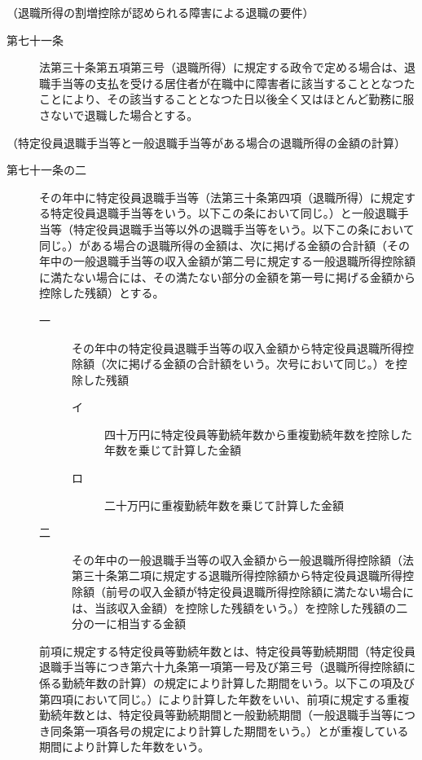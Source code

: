 \documentclass[twocolumn,a4j,10pt]{ltjtarticle}
\begin{document}
\noindent\hspace{10pt}（退職所得の割増控除が認められる障害による退職の要件）
\begin{description}
\item[第七十一条]法第三十条第五項第三号（退職所得）に規定する政令で定める場合は、退職手当等の支払を受ける居住者が在職中に障害者に該当することとなつたことにより、その該当することとなつた日以後全く又はほとんど勤務に服さないで退職した場合とする。
\end{description}
\noindent\hspace{10pt}（特定役員退職手当等と一般退職手当等がある場合の退職所得の金額の計算）
\begin{description}
\item[第七十一条の二]その年中に特定役員退職手当等（法第三十条第四項（退職所得）に規定する特定役員退職手当等をいう。以下この条において同じ。）と一般退職手当等（特定役員退職手当等以外の退職手当等をいう。以下この条において同じ。）がある場合の退職所得の金額は、次に掲げる金額の合計額（その年中の一般退職手当等の収入金額が第二号に規定する一般退職所得控除額に満たない場合には、その満たない部分の金額を第一号に掲げる金額から控除した残額）とする。
\begin{description}
\item[一]その年中の特定役員退職手当等の収入金額から特定役員退職所得控除額（次に掲げる金額の合計額をいう。次号において同じ。）を控除した残額
\begin{description}
\item[イ]四十万円に特定役員等勤続年数から重複勤続年数を控除した年数を乗じて計算した金額
\item[ロ]二十万円に重複勤続年数を乗じて計算した金額
\end{description}
\item[二]その年中の一般退職手当等の収入金額から一般退職所得控除額（法第三十条第二項に規定する退職所得控除額から特定役員退職所得控除額（前号の収入金額が特定役員退職所得控除額に満たない場合には、当該収入金額）を控除した残額をいう。）を控除した残額の二分の一に相当する金額
\end{description}
\item[]前項に規定する特定役員等勤続年数とは、特定役員等勤続期間（特定役員退職手当等につき第六十九条第一項第一号及び第三号（退職所得控除額に係る勤続年数の計算）の規定により計算した期間をいう。以下この項及び第四項において同じ。）により計算した年数をいい、前項に規定する重複勤続年数とは、特定役員等勤続期間と一般勤続期間（一般退職手当等につき同条第一項各号の規定により計算した期間をいう。）とが重複している期間により計算した年数をいう。

\end{description}
\end{document}
